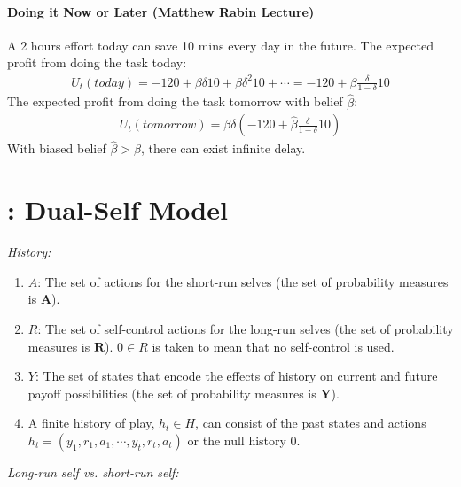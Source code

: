 \documentclass[11pt]{elegantbook}
\begin{document}
\paragraph*{Doing it Now or Later (Matthew Rabin Lecture)}
A 2 hours effort today can save 10 mins every day in the future. The expected profit from doing the task today:
\begin{equation}
    \begin{aligned}
        U_t(today)=-120+\beta \delta 10 + \beta \delta^2 10 + \cdots=-120+\beta\frac{\delta}{1-\delta}10
    \end{aligned}
    \nonumber
\end{equation}
The expected profit from doing the task tomorrow with belief $\hat{\beta}$:
\begin{equation}
    \begin{aligned}
        U_t(tomorrow)=\beta\delta\left(-120+\hat{\beta}\frac{\delta}{1-\delta}10\right)
    \end{aligned}
    \nonumber
\end{equation}
With biased belief $\hat{\beta}>\beta$, there can exist infinite delay.



\section{\cite{fudenberg2006dual}: Dual-Self Model}
\textit{History:}
\begin{enumerate}
    \item $A$: The set of actions for the short-run selves (the set of probability measures is $\mathbf{A}$).
    \item $R$: The set of self-control actions for the long-run selves (the set of probability measures is $\mathbf{R}$). $0\in R$ is taken to mean that no self-control is used.
    \item $Y$: The set of states that encode the effects of history on current and future payoff possibilities (the set of probability measures is $\mathbf{Y}$).
    \item A finite history of play, $h_t\in H$, can consist of the past states and actions $h_t=(y_1,r_1,a_1,\cdots,y_t,r_t,a_t)$ or the null history $0$.
\end{enumerate}

\textit{Long-run self vs. short-run self:}
\end{document}
